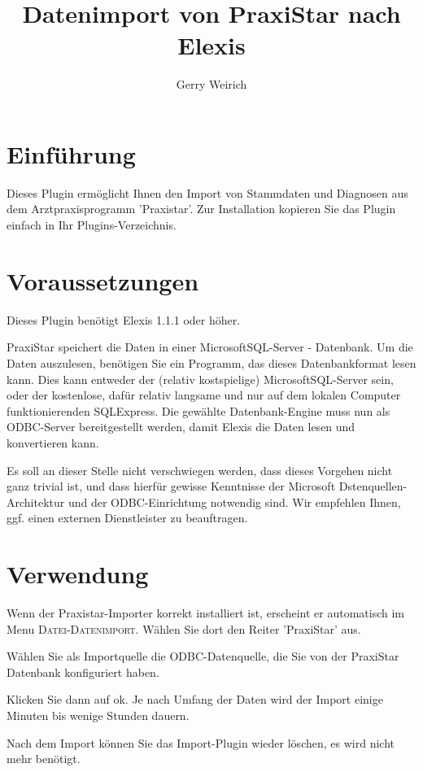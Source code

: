 \documentclass[a4paper]{scrartcl}
\title{Datenimport von PraxiStar nach Elexis\textsuperscript{\textregistered}}
\author{Gerry Weirich}
\begin{document}
\maketitle
\section{Einführung}

Dieses Plugin ermöglicht Ihnen den Import von Stammdaten und Diagnosen aus dem Arztpraxisprogramm 'Praxistar'.
Zur Installation kopieren Sie das Plugin einfach in Ihr Plugins-Verzeichnis.

\section{Voraussetzungen}
Dieses Plugin benötigt Elexis 1.1.1 oder höher.

\medskip

PraxiStar speichert die Daten in einer Microsoft\texttrademark SQL-Server - Datenbank. Um die Daten auszulesen, benötigen Sie ein Programm, das dieses Datenbankformat lesen kann. Dies kann entweder der (relativ kostspielige) Microsoft\texttrademark SQL-Server sein, oder der kostenlose, dafür relativ langsame und nur auf dem lokalen Computer funktionierenden SQLExpress. Die gewählte Datenbank-Engine muss nun als ODBC-Server bereitgestellt werden, damit Elexis die Daten lesen und konvertieren kann.

Es soll an dieser Stelle nicht verschwiegen werden, dass dieses Vorgehen nicht ganz trivial ist, und dass hierfür gewisse Kenntnisse der Microsoft Dstenquellen-Architektur und der ODBC-Einrichtung notwendig sind. Wir empfehlen Ihnen, ggf. einen externen Dienstleister zu beauftragen.

\medskip

\section{Verwendung}
Wenn der Praxistar-Importer korrekt installiert ist, erscheint er automatisch im Menu \textsc{Datei-Datenimport}. Wählen Sie dort den Reiter 'PraxiStar' aus. 

Wählen Sie als Importquelle die ODBC-Datenquelle, die Sie von der PraxiStar Datenbank konfiguriert haben.

Klicken Sie dann auf ok. Je nach Umfang der Daten wird der Import einige Minuten bis wenige Stunden dauern.

\bigskip

Nach dem Import können Sie das Import-Plugin wieder löschen, es wird nicht mehr benötigt.
\end{document}
